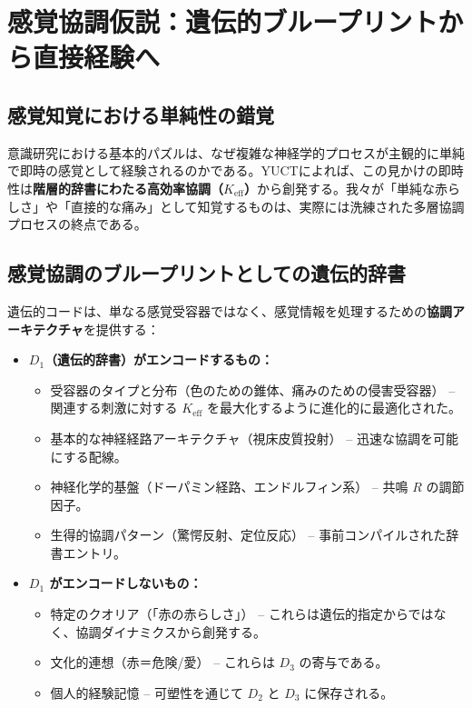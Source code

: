 \documentclass[12pt,a4paper]{article}
\newcommand{\eff}{\mathrm{eff}}
\newcommand{\Ke}{K_{\eff}}
\begin{document}
	\section{感覚協調仮説：遺伝的ブループリントから直接経験へ}
	
	\subsection{感覚知覚における単純性の錯覚}
	
	意識研究における基本的パズルは、なぜ複雑な神経学的プロセスが主観的に単純で即時の感覚として経験されるのかである。YUCTによれば、この見かけの即時性は\textbf{階層的辞書にわたる高効率協調（\(\Ke\)）}から創発する。我々が「単純な赤らしさ」や「直接的な痛み」として知覚するものは、実際には洗練された多層協調プロセスの終点である。
	
	\subsection{感覚協調のブループリントとしての遺伝的辞書}
	
	遺伝的コードは、単なる感覚受容器ではなく、感覚情報を処理するための\textbf{協調アーキテクチャ}を提供する：
	
	\begin{itemize}
		\item \textbf{\(D_1\)（遺伝的辞書）がエンコードするもの：}
		\begin{itemize}
			\item 受容器のタイプと分布（色のための錐体、痛みのための侵害受容器） – 関連する刺激に対する \(\Ke\) を最大化するように進化的に最適化された。
			\item 基本的な神経経路アーキテクチャ（視床皮質投射） – 迅速な協調を可能にする配線。
			\item 神経化学的基盤（ドーパミン経路、エンドルフィン系） – 共鳴 \(R\) の調節因子。
			\item 生得的協調パターン（驚愕反射、定位反応） – 事前コンパイルされた辞書エントリ。
		\end{itemize}
		
		\item \textbf{\(D_1\) がエンコードしないもの：}
		\begin{itemize}
			\item 特定のクオリア（「赤の赤らしさ」） – これらは遺伝的指定からではなく、協調ダイナミクスから創発する。
			\item 文化的連想（赤＝危険/愛） – これらは \(D_3\) の寄与である。
			\item 個人的経験記憶 – 可塑性を通じて \(D_2\) と \(D_3\) に保存される。
		\end{itemize}
	\end{itemize}
	
\end{document}
